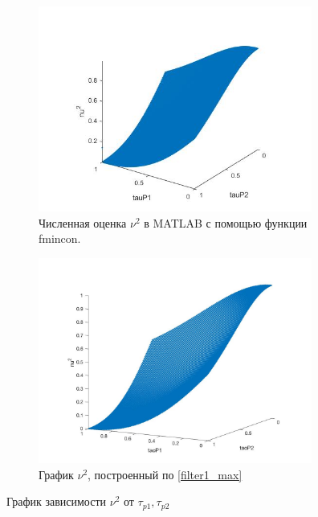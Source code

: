 \documentclass[a4paper,article,14pt]{extarticle}
\begin{document}
\begin{figure}[H]
\begin{subfigure}{.5\textwidth}
  \includegraphics[width=9cm]{images/filter1_exact.jpg}
  \caption{Численная оценка $\nu^2$ в MATLAB с помощью функции fmincon.}
  \label{fig:sub1}
\end{subfigure}%
\begin{subfigure}{.5\textwidth}
\includegraphics[width=9cm]{images/filter1_1.jpg}
  \caption{График $\nu^2$, построенный по \eqref{filter1_max}}
  \label{fig:sub2}
\end{subfigure}
\caption{График зависимости $\nu^2$ от $\tau_{p1}, \tau_{p2}$}
\label{fig:filter1_fig}
\end{figure}


\pagebreak
\end{document}
